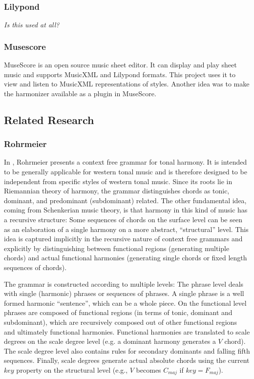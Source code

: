 \subsubsection{Lilypond}
\label{sec:tools.lilypond}

\textit{Is this used at all?}

\subsubsection{Musescore}

MuseScore \cite{musescore} is an open source music sheet editor.
It can display and play sheet music and supports MusicXML and Lilypond formats.
This project uses it to view and listen to MusicXML representations of styles.
Another idea was to make the harmonizer available as a plugin in MuseScore.

\subsection{Related Research}

\subsubsection{Rohrmeier}

In \autocite{rohrmeier_towards_2011}, Rohrmeier presents a context free grammar for tonal harmony.
It is intended to be generally applicable for western tonal music and is therefore designed to be independent from specific styles of western tonal music.
Since its roots lie in Riemannian theory of harmony, the grammar distinguishes chords as tonic, dominant, and predominant (subdominant) related.
The other fundamental idea, coming from Schenkerian music theory, is that harmony in this kind of music has a recursive structure:
Some sequences of chords on the surface level can be seen as an elaboration of a single harmony on a more abstract, ``structural'' level.
This idea is captured implicitly in the recursive nature of context free grammars and explicitly by distinguishing between functional regions (generating multiple chords) and actual functional harmonies (generating single chords or fixed length sequences of chords).

The grammar is constructed according to multiple levels:
The phrase level deals with single (harmonic) phrases or sequences of phrases.
A single phrase is a well formed harmonic ``sentence'', which can be a whole piece.
On the functional level phrases are composed of functional regions (in terms of tonic, dominant and subdominant), which are recursively composed out of other functional regions and ultimately functional harmonies.
Functional harmonies are translated to scale degrees on the scale degree level (e.g. a dominant harmony generates a $V$ chord).
The scale degree level also contains rules for secondary dominants and falling fifth sequences.
Finally, scale degrees generate actual absolute chords using the current $key$ property on the structural level (e.g., $V$ becomes $C_{maj}$ if $key = F_{maj}$).

